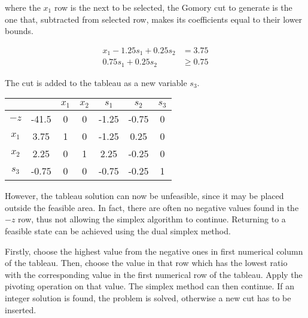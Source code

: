 where the $x_1$ row is the next to be selected, the Gomory cut to generate is the one that, subtracted from selected row, makes its coefficients equal to their lower bounds.

\begin{align*}
    x_1 - 1.25 s_1 + 0.25 s_2 & = 3.75 \\
    0.75 s_1 + 0.25 s_2 & \ge 0.75
\end{align*}

The cut is added to the tableau as a new variable $s_3$.

\begin{center}
    \begin{tabular}{c|c|ccccc}
        & & $x_1$ & $x_2$ & $s_1$ & $s_2$ & $s_3$ \\ \hline
        $-z$ & -41.5 & 0 & 0 & -1.25 & -0.75 & 0 \\ \hline
        $x_1$ & 3.75 & 1 & 0 & -1.25 & 0.25 & 0 \\
        $x_2$ & 2.25 & 0 & 1 & 2.25 & -0.25  & 0 \\
        $s_3$ & -0.75 & 0 & 0 & -0.75 & -0.25 & 1
    \end{tabular}
\end{center}

However, the tableau solution can now be unfeasible, since it may be placed outside the feasible area.
In fact, there are often no negative values found in the $-z$ row, thus not allowing the simplex algorithm to continue.
Returning to a feasible state can be achieved using the dual simplex method.

Firstly, choose the highest value from the negative ones in first numerical column of the tableau.
Then, choose the value in that row which has the lowest ratio with the corresponding value in the first numerical row of the tableau.
Apply the pivoting operation on that value.
The simplex method can then continue.
If an integer solution is found, the problem is solved, otherwise a new cut has to be inserted.

